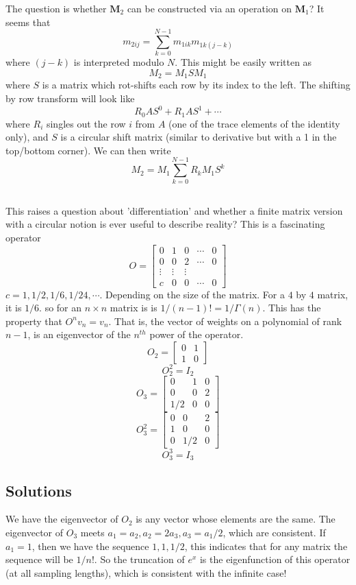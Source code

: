 \documentclass{article}
\begin{document}
The question is whether $\mathbf{M}_2$ can be constructed via an operation on $\mathbf{M}_1$? It seems that 
$$
m_{2 ij} = \sum_{k=0}^{N-1} m_{1 i k} m_{1k(j-k)}
$$
where $(j-k)$ is interpreted modulo $N$. This might be easily written as 
$$
M_2 = M_1 S M_1
$$
where $S$ is a matrix which rot-shifts each row by its index to the left. The shifting by row transform will look like 
$$
R_0 A S^0 +R_1 A S^1 + \cdots
$$
where $R_i$ singles out the row $i$ from $A$ (one of the trace elements of the identity only), and $S$ is a circular shift matrix (similar to derivative but with a 1 in the top/bottom corner). We can then write 
$$
M_2 = M_1 \sum_{k=0}^{N-1} R_k M_1 S^k
$$

\subsection{}
This raises a question about 'differentiation' and whether a finite matrix version with a circular notion is ever useful to describe reality? This is a fascinating operator 
$$
O=
\begin{bmatrix}
0 & 1 & 0 & \cdots & 0 \\
0 & 0 & 2 & \cdots & 0 \\
\vdots & \vdots & \vdots & & \\
c & 0 & 0 & \cdots & 0
\end{bmatrix}
$$
$c=1,1/2,1/6,1/24,\cdots$. Depending on the size of the matrix. For a $4$ by $4$ matrix, it is $1/6$. so for an $n\times n$ matrix is is $1/(n-1)!= 1/\Gamma(n)$. This has the property that $O^n v_n = v_n$. That is, the vector of weights on a polynomial of rank $n-1$, is an eigenvector of the $n^{th}$ power of the operator.
$$
O_2 = \begin{bmatrix} 0 & 1 \\ 1 & 0 \end{bmatrix}
$$
$$
O_2^2 = I_2
$$
$$
O_3 = \begin{bmatrix} 0 & 1 & 0 \\ 0 & 0 & 2 \\ 1/2 & 0 & 0 \end{bmatrix}
$$
$$
O_3^2 = \begin{bmatrix} 0 & 0 & 2 \\ 1 & 0 & 0 \\ 0 & 1/2 & 0 \end{bmatrix}
$$
$$
O_3^3 = I_3
$$

\subsection{Solutions}
We have the eigenvector of $O_2$ is any vector whose elements are the same. The eigenvector of $O_3$ meets $a_1 = a_2, a_2 = 2a_3, a_3 = a_1/2$, which are consistent. If $a_1 = 1$, then we have the sequence $1,1,1/2$, this indicates that for any matrix the sequence will be $1/n!$. So the truncation of $e^x$ is the eigenfunction of this operator (at all sampling lengths), which is consistent with the infinite case!
\end{document}
